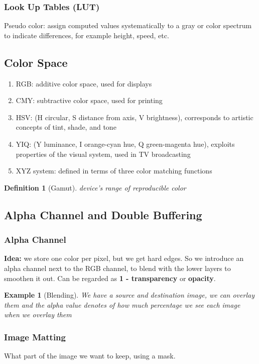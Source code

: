 \documentclass[11pt]{article}
\newtheorem{definition}[theorem]{Definition}
\newtheorem{example}[theorem]{Example}
\begin{document}
\subsubsection{Look Up Tables (LUT)}
Pseudo color: assign computed values systematically to a gray or color spectrum to indicate differences, for example height, speed, etc. 

\subsection{Color Space}
\begin{enumerate}
    \item RGB: additive color space, used for displays
    \item CMY: subtractive color space, used for printing
    \item HSV: (H circular, S distance from axis, V brightness), corresponds to artistic concepts of tint, shade, and tone
    \item YIQ: (Y luminance, I orange-cyan hue, Q green-magenta hue), exploits properties of the visual system, used in TV broadcasting
    \item XYZ system: defined in terms of three color matching functions  
\end{enumerate}

\begin{definition}[Gamut] 
    device's range of reproducible color
\end{definition}

\subsection{Alpha Channel and Double Buffering}
\subsubsection{Alpha Channel}
\textbf{Idea:}  we store one color per pixel, but we get hard edges. So we introduce an alpha channel next to the RGB channel, to blend with the lower layers to smoothen it out. Can be regarded as \textbf{1 - transparency} or \textbf{opacity}. 

\begin{example}[Blending]
    We have a source and destination image, we can overlay them and the alpha value denotes of how much percentage we see each image when we overlay them
\end{example}

\subsubsection{Image Matting} 
What part of the image we want to keep, using a mask.
\end{document}

